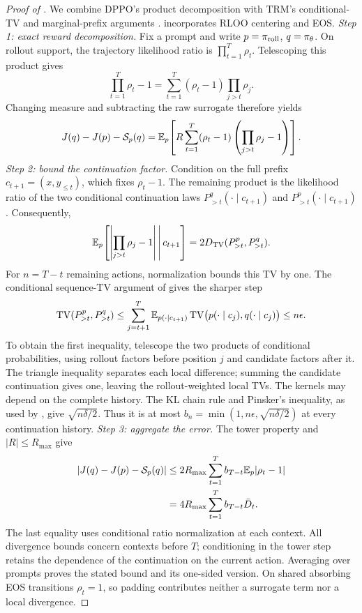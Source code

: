 \begin{proof}[Proof of ]
We combine DPPO's product decomposition
\citep[Appendix~B.1]{qi2026rethinkingtrustregionllm} with TRM's conditional-TV
and marginal-prefix arguments \citep[Appendices~D and C.2]{li2025trm}.
 incorporates RLOO centering and EOS.
\emph{Step 1: exact reward decomposition.}
Fix a prompt and write $p=\pi_{\mathrm{roll}}$, $q=\pi_{\theta}$.
On rollout support, the trajectory likelihood ratio is $\prod_{t=1}^T\rho_t$.
Telescoping this product gives
\[
 \prod_{t=1}^T\rho_t-1
 =\sum_{t=1}^T(\rho_t-1)\prod_{j>t}\rho_j.
\]
Changing measure and subtracting the raw surrogate therefore yields
\[
 J(q)-J(p)-\mathcal S_p(q)
 =\mathbb{E}_p\!\left[R\sum_{t=1}^T(\rho_t-1)
                  \left(\prod_{j>t}\rho_j-1\right)\right].
\]
\emph{Step 2: bound the continuation factor.}
Condition on the full prefix $c_{t+1}=(x,y_{\le t})$, which fixes
$\rho_t-1$. The remaining product is the likelihood ratio of the two
conditional continuation laws $P^q_{>t}(\cdot\mid c_{t+1})$ and
$P^p_{>t}(\cdot\mid c_{t+1})$. Consequently,
\[
 \mathbb{E}_p\!\left[\left|\prod_{j>t}\rho_j-1\right|\,\middle|\,c_{t+1}\right]
 =2D_{\mathrm{TV}}(P^p_{>t},P^q_{>t}).
\]
For $n=T-t$ remaining actions, normalization bounds this TV by one.
The conditional sequence-TV argument of
\citet[Appendix~B.2]{qi2026rethinkingtrustregionllm} gives the sharper step
\[
 \operatorname{TV}(P^p_{>t},P^q_{>t})\le
 \sum_{j=t+1}^{T}\mathbb{E}_{p(\cdot\mid c_{t+1})}
 \operatorname{TV}\bigl(p(\cdot\mid c_j),q(\cdot\mid c_j)\bigr)
 \le n\epsilon.
\]
To obtain the first inequality, telescope the two products of conditional
probabilities, using rollout factors before position $j$ and candidate
factors after it. The triangle inequality separates each local difference;
summing the candidate continuation gives one, leaving the rollout-weighted
local TVs. The kernels may depend on the complete history. The KL chain rule and Pinsker's inequality, as used by
\citet[Appendix~D]{li2025trm}, give $\sqrt{n\delta/2}$.
Thus it is at most $b_n=\min(1,n\epsilon,\sqrt{n\delta/2})$ at every
continuation history.
\emph{Step 3: aggregate the error.} The tower property and $|R|\le R_{\max}$ give
\begin{align*}
 |J(q)-J(p)-\mathcal S_p(q)|
 &\le 2R_{\max}\sum_{t=1}^T b_{T-t}\mathbb{E}_p|\rho_t-1|\\
 &=4R_{\max}\sum_{t=1}^T b_{T-t}\bar D_t.
\end{align*}
The last equality uses conditional ratio normalization at each context.
All divergence bounds concern contexts before $T$; conditioning in the
tower step retains the dependence of the continuation on the current action.
Averaging over prompts proves the stated bound and its one-sided version.
On shared absorbing EOS transitions $\rho_t=1$, so padding contributes
neither a surrogate term nor a local divergence.


\end{proof}
